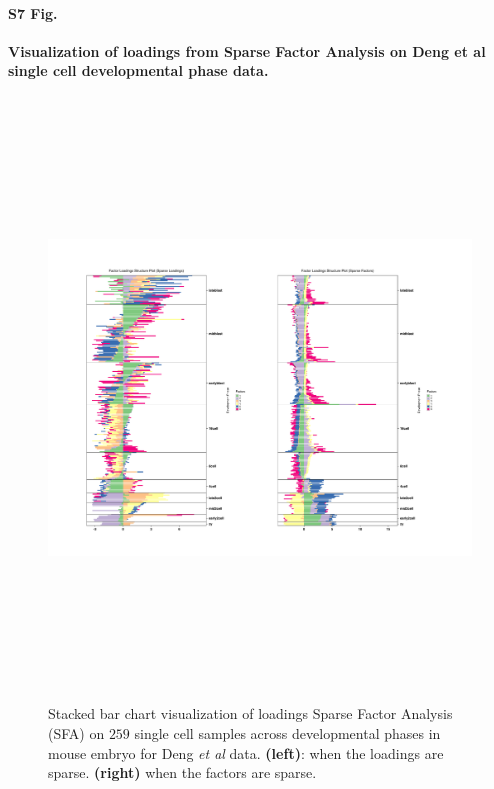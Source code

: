 \documentclass[10pt,letterpaper]{article}
\begin{document}
\paragraph*{S7 Fig.}

\label{figS7}
{\bf Visualization of loadings from Sparse Factor Analysis on Deng et al single cell developmental phase data.}
\begin{figure}[ht]
\centering
\includegraphics[height=6.3in, width=7in]{../../plots/deng-figures/sfa_deng_figs.pdf}
 \caption{ Stacked bar chart visualization of loadings Sparse Factor Analysis (SFA) on $259$ single cell samples 
 across developmental phases in mouse embryo for Deng \textit{et al} data. \textbf{(left)}: when the loadings are sparse. \textbf{(right)} when the factors are sparse.}
\end{figure}
\end{document}
